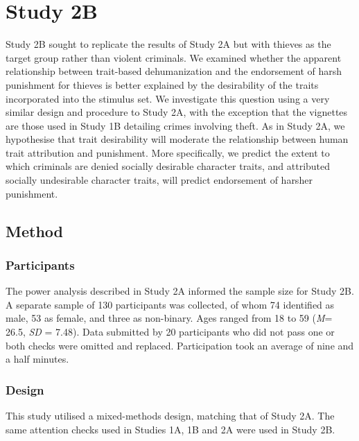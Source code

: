 \documentclass[
]{article}
\begin{document}
\hypertarget{study-2b}{%
\section{Study 2B}\label{study-2b}}

Study 2B sought to replicate the results of Study 2A but with thieves as the target group rather than violent criminals. We examined whether the apparent relationship between trait-based dehumanization and the endorsement of harsh punishment for thieves is better explained by the desirability of the traits incorporated into the stimulus set. We investigate this question using a very similar design and procedure to Study 2A, with the exception that the vignettes are those used in Study 1B detailing crimes involving theft. As in Study 2A, we hypothesise that trait desirability will moderate the relationship between human trait attribution and punishment. More specifically, we predict the extent to which criminals are denied socially desirable character traits, and attributed socially undesirable character traits, will predict endorsement of harsher punishment.

\hypertarget{method-2}{%
\subsection{Method}\label{method-2}}

\hypertarget{participants-3}{%
\subsubsection{Participants}\label{participants-3}}

The power analysis described in Study 2A informed the sample size for Study 2B. A separate sample of 130 participants was collected, of whom 74 identified as male, 53 as female, and three as non-binary. Ages ranged from 18 to 59 (\emph{M}= 26.5, \emph{SD} = 7.48). Data submitted by 20 participants who did not pass one or both checks were omitted and replaced. Participation took an average of nine and a half minutes.

\hypertarget{design-2}{%
\subsubsection{Design}\label{design-2}}

This study utilised a mixed-methods design, matching that of Study 2A. The same attention checks used in Studies 1A, 1B and 2A were used in Study 2B.
\end{document}

